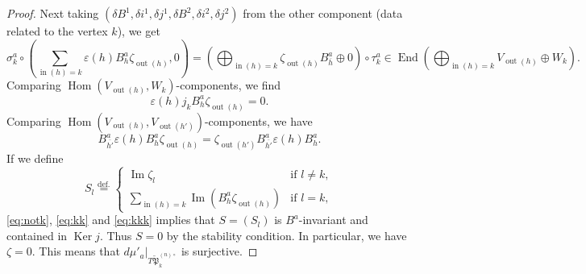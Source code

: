 \documentclass[12pt]{amsart}
\def\frak{\mathfrak}
\theoremstyle{definition}
\theoremstyle{remark}
\numberwithin{equation}{subsection}
\newcommand{\defeq}{\overset{\operatorname{\scriptstyle def.}}{=}}
\newcommand{\End}{\operatorname{End}}
\newcommand{\Hom}{\operatorname{Hom}}
\newcommand{\Ker}{\operatorname{Ker}}
\newcommand{\Ima}{\operatorname{Im}}
\newcommand{\vin}{\operatorname{in}} %
\newcommand{\vout}{\operatorname{out}} %
\newcommand{\M}{{\frak M}} %
\newcommand{\Pa}{{\frak P}} %
\newcommand{\Mp}{\widetilde\M}
\begin{document}
\begin{proof}
Next taking 
$(\delta B^1, \delta i^1, \delta j^1, \delta B^2,
\delta i^2, \delta j^2)$ from the other component (data related to the
vertex $k$), we get
\begin{equation*}
   \sigma_k^a \circ
   \left(\sum_{\vin(h)=k} \varepsilon(h) B^a_h \zeta_{\vout(h)}, 0\right)
   = \left(
   \bigoplus_{\vin(h)=k} \zeta_{\vout(h)} B^a_{\overline{h}} \oplus 0
    \right)\circ \tau_k^a
   \in
   \End\left(\bigoplus_{\vin(h)=k} V_{\vout(h)}\oplus W_k\right).
\end{equation*}
Comparing $\Hom(V_{\vout(h)}, W_k)$-components, we find
\begin{equation}\label{eq:kk}
   \varepsilon(h) j_k B^a_h \zeta_{\vout(h)} 
   = 0.
\end{equation}
Comparing $\Hom(V_{\vout(h)}, V_{\vout(h')})$-components, we have
\begin{equation}\label{eq:kkk}
   B^a_{\overline{h'}}\varepsilon(h) B^a_h \zeta_{\vout(h)}
   = \zeta_{\vout(h')} B^a_{\overline{h'}}\varepsilon(h) B^a_h.
\end{equation}
If we define
\begin{equation*}
   S_l \defeq
   \begin{cases}
      \Ima \zeta_l & \text{if $l\neq k$}, \\
      \sum_{\vin(h)=k} \Ima\left(B^a_h \zeta_{\vout(h)}\right)
      &\text{if $l = k$},
   \end{cases}
\end{equation*}
\eqref{eq:notk}, \eqref{eq:kk} and \eqref{eq:kkk} implies that $S =
(S_l)$ is $B^a$-invariant and contained in $\Ker j$. Thus $S = 0$ by
the stability condition. In particular, we have $\zeta = 0$.  This
means that $d\mu'_a|_{T\widetilde\Pa_k^{(n)\circ}}$ is surjective.

\end{proof}
\end{document}
